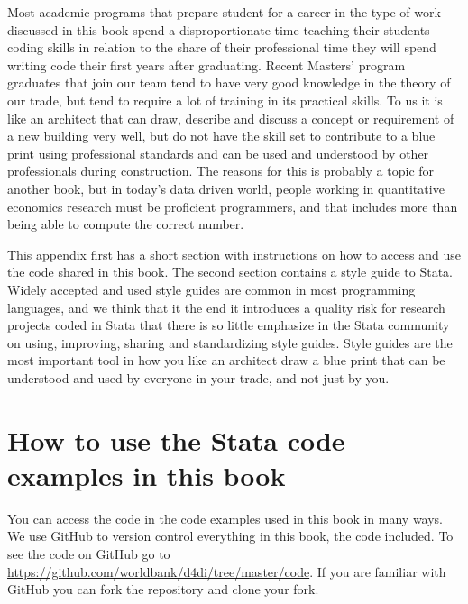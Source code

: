 
\begin{fullwidth}
	
Most academic programs that prepare student for a career in the type of work discussed in this book 
spend a disproportionate time teaching their students coding skills in relation to the share of 
their professional time they will spend writing code their first years after graduating. Recent 
Masters' program graduates that join our team tend to have very good knowledge in the theory of our
trade, but tend to require a lot of training in its practical skills. To us it is like an architect 
that can draw, describe and discuss a concept or requirement of a new building very well, but do 
not have the skill set to contribute to a blue print using professional standards and can be used 
and understood by other professionals during construction. The reasons for this is probably a topic
for another book, but in today's data driven world, people working in quantitative economics research 
must be proficient programmers, and that includes more than being able to compute the correct number.

This appendix first has a short section with instructions on how to access and use the code shared in 
this book. The second section contains a style guide to Stata. Widely accepted and used style guides 
are common in most programming languages, and we think that it the end it introduces a quality risk 
for research projects coded in Stata that there is so little emphasize in the Stata community on using, 
improving, sharing and standardizing style guides. Style guides are the most important tool in how 
you like an architect draw a blue print that can be understood and used by everyone in your trade, 
and not just by you.


\end{fullwidth}


\section{How to use the Stata code examples in this book}

You can access the code in the code examples used in this book in many ways. We use GitHub to version 
control everything in this book, the code included. To see the code on GitHub go to
\url{https://github.com/worldbank/d4di/tree/master/code}. If you are familiar with GitHub you can
fork the repository and clone your fork. 

